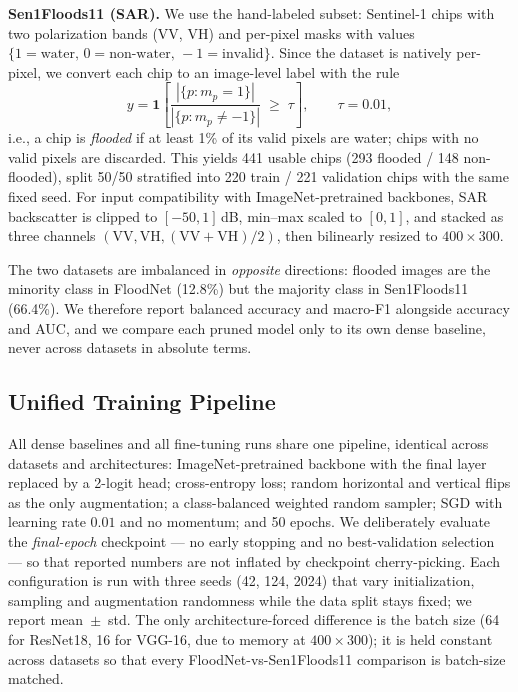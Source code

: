 \documentclass[conference]{IEEEtran}
\begin{document}
\textbf{Sen1Floods11 (SAR).} We use the hand-labeled subset:
Sentinel-1 chips with two polarization bands (VV, VH) and per-pixel
masks with values
$\{1{=}\text{water},\,0{=}\text{non-water},\,-1{=}\text{invalid}\}$.
Since the dataset is natively per-pixel, we convert each chip to an
image-level label with the rule
\begin{equation}
y = \mathbf{1}\!\left[\frac{\left|\{p : m_p = 1\}\right|}
{\left|\{p : m_p \neq -1\}\right|} \;\geq\; \tau\right],
\qquad \tau = 0.01,
\label{eq:labelconv}
\end{equation}
i.e., a chip is \emph{flooded} if at least 1\% of its valid pixels are
water; chips with no valid pixels are discarded. This yields 441
usable chips (293 flooded / 148 non-flooded), split 50/50 stratified
into 220 train / 221 validation chips with the same fixed seed. For
input compatibility with ImageNet-pretrained backbones, SAR
backscatter is clipped to $[-50, 1]$\,dB, min--max scaled to $[0,1]$,
and stacked as three channels $(\mathrm{VV}, \mathrm{VH},
(\mathrm{VV}{+}\mathrm{VH})/2)$, then bilinearly resized to
$400\times300$.

The two datasets are imbalanced in \emph{opposite} directions: flooded
images are the minority class in FloodNet (12.8\%) but the majority
class in Sen1Floods11 (66.4\%). We therefore report balanced accuracy
and macro-F1 alongside accuracy and AUC, and we compare each pruned
model only to its own dense baseline, never across datasets in
absolute terms.

\subsection{Unified Training Pipeline}
All dense baselines and all fine-tuning runs share one pipeline,
identical across datasets and architectures: ImageNet-pretrained
backbone \cite{deng2009imagenet} with the final layer replaced by a
2-logit head; cross-entropy loss; random horizontal and vertical flips
as the only augmentation; a class-balanced weighted random sampler;
SGD with learning rate $0.01$ and no momentum; and 50 epochs. We
deliberately evaluate the \emph{final-epoch} checkpoint --- no
early stopping and no best-validation selection --- so that reported
numbers are not inflated by checkpoint cherry-picking. Each
configuration is run with three seeds (42, 124, 2024) that vary
initialization, sampling and augmentation randomness while the data
split stays fixed; we report mean~$\pm$~std. The only
architecture-forced difference is the batch size (64 for ResNet18, 16
for VGG-16, due to memory at $400\times300$); it is held constant
across datasets so that every FloodNet-vs-Sen1Floods11 comparison is
batch-size matched.
\end{document}
